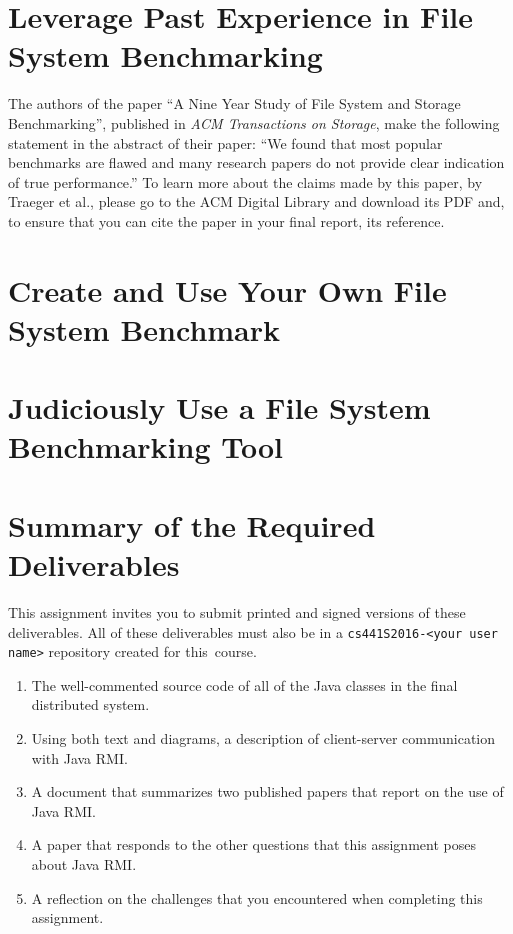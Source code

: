 \section*{Leverage Past Experience in File System Benchmarking}

The authors of the paper ``A Nine Year Study of File System and Storage Benchmarking'', published in {\em ACM
Transactions on Storage}, make the following statement in the abstract of their paper: ``We found that most popular
benchmarks are flawed and many research papers do not provide clear indication of true performance.'' To learn more
about the claims made by this paper, by Traeger et al., please go to the ACM Digital Library and download its PDF and,
to ensure that you can cite the paper in your final report, its  reference.

\section*{Create and Use Your Own File System Benchmark}

\section*{Judiciously Use a File System Benchmarking Tool}


\section*{Summary of the Required Deliverables}

This assignment invites you to submit printed and signed versions of these deliverables. All of these deliverables must
also be in a {\tt cs441S2016-<your user name>} repository created for \mbox{this course}.

\vspace*{-.1in}

\begin{enumerate}
  \itemsep 0em

  \item The well-commented source code of all of the Java classes in the final distributed system.

  \item Using both text and diagrams, a description of client-server communication with Java RMI.

  \item A document that summarizes two published papers that report on the use of Java RMI.

  \item A paper that responds to the other questions that this assignment poses about Java RMI.

  \item A reflection on the challenges that you encountered when completing this assignment.

\end{enumerate}

